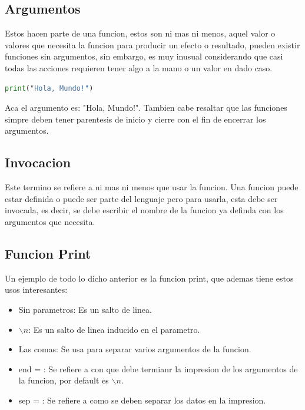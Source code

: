 \documentclass{article}
\begin{document}
\subsection{Argumentos}
Estos hacen parte de una funcion, estos son ni mas ni menos, aquel valor o valores que necesita la funcion para producir un efecto o resultado, pueden existir funciones sin argumentos, sin embargo, es muy inusual considerando que casi todas las acciones requieren tener algo a la mano o un valor en dado caso. 
\begin{lstlisting}[language=Python, caption=Tu primer Programa]
print("Hola, Mundo!")
\end{lstlisting}
Aca el argumento es: "Hola, Mundo!". Tambien cabe resaltar que las funciones simpre deben tener parentesis de inicio y cierre con el fin de encerrar los argumentos. 
\subsection{Invocacion}
Este termino se refiere a ni mas ni menos que usar la funcion. Una funcion puede estar definida o puede ser parte del lenguaje pero para usarla, esta debe ser invocada, es decir, se debe escribir el nombre de la funcion ya definda con los argumentos que necesita. 
\subsection{Funcion Print}
Un ejemplo de todo lo dicho anterior es la funcion print, que ademas tiene estos usos interesantes:
\begin{itemize}
    \item Sin parametros: Es un salto de linea.
    \item \(\backslash n\): Es un salto de linea inducido en el parametro.
    \item Las comas: Se usa para separar varios argumentos de la funcion.
    \item end = : Se refiere a con que debe termianr la impresion de los argumentos de la funcion, por default es \(\backslash n\).
    \item sep = : Se refiere a como se deben separar los datos en la impresion.
\end{itemize}
\end{document}
